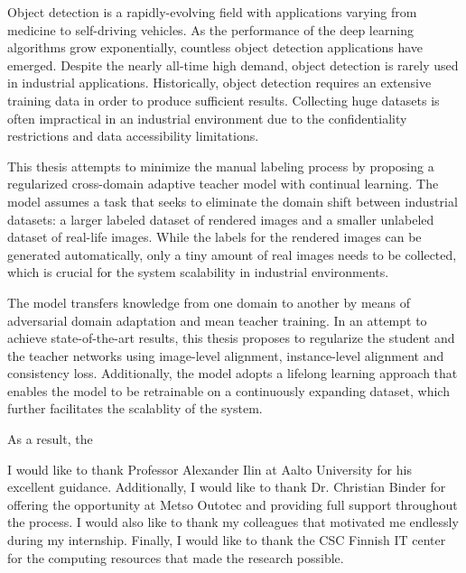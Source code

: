 \documentclass[english, 12pt, a4paper, elec, utf8, a-1b, online]{aaltothesis}
\begin{document}
\begin{abstractpage}[english]

Object detection is a rapidly-evolving field with applications varying from medicine to self-driving vehicles. As the performance of the deep learning algorithms grow exponentially, countless object detection applications have emerged. Despite the nearly all-time high demand, object detection is rarely used in industrial applications. Historically, object detection requires an extensive training data in order to produce sufficient results. Collecting huge datasets is often impractical in an  industrial environment due to the confidentiality restrictions and data accessibility limitations. 

This thesis attempts to minimize the manual labeling process by proposing a regularized cross-domain adaptive teacher model with continual learning. The model assumes a task that seeks to eliminate the domain shift between industrial datasets: a larger labeled dataset of rendered images and a smaller unlabeled dataset of real-life images. While the labels for the rendered images can be generated automatically, only a tiny amount of real images needs to be collected, which is crucial for the system scalability in industrial environments.  

The model transfers knowledge from one domain to another by means of adversarial domain adaptation and mean teacher training. In an attempt to achieve state-of-the-art results, this thesis proposes to regularize the student and the teacher networks using image-level alignment, instance-level alignment and consistency loss. Additionally, the model adopts a lifelong learning approach that enables the model to be retrainable on a continuously expanding dataset, which further facilitates the scalablity of the system.

As a result, the 

 
\end{abstractpage}


I would like to thank Professor Alexander Ilin at Aalto University for his excellent guidance. Additionally, I would like to thank Dr. Christian Binder for offering the opportunity at Metso Outotec and providing full support throughout the process. I would also like to thank my colleagues that motivated me endlessly during my internship. Finally, I would like to thank the CSC Finnish IT center for the computing resources that made the research possible. \\
\end{document}
